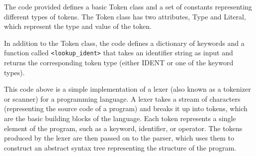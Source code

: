 The code provided defines a basic Token class and a set of constants representing different types of tokens. The Token class has two attributes, Type and Literal, which represent the type and value of the token.

In addition to the Token class, the code defines a dictionary of keywords and a function called \texttt{<lookup\_ident>} that takes an identifier string as input and returns the corresponding token type (either IDENT or one of the keyword types).

This code above is a simple implementation of a lexer (also known as a tokenizer or scanner) for a programming language. A lexer takes a stream of characters (representing the source code of a program) and breaks it up into tokens, which are the basic building blocks of the language. Each token represents a single element of the program, such as a keyword, identifier, or operator. The tokens produced by the lexer are then passed on to the parser, which uses them to construct an abstract syntax tree representing the structure of the program.